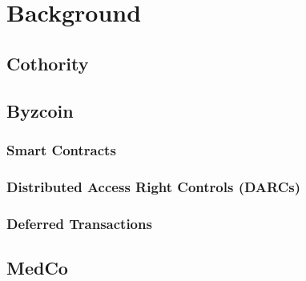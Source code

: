 \section{Background}


\subsection{Cothority}

\subsection{Byzcoin}


\subsubsection{Smart Contracts}
\subsubsection{Distributed Access Right Controls (DARCs)}
\subsubsection{Deferred Transactions}


\subsection{MedCo}